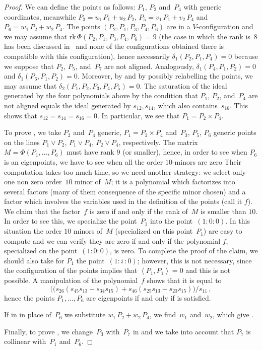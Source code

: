 \documentclass[a4paper, 11pt, reqno]{amsart}
\theoremstyle{plain}
\theoremstyle{definition}
\newcommand{\iii}{\textit{i}\,}
\newcommand{\rk}{\ensuremath{\mathrm{rk}}}
\newcommand{\scl}[2]{\left\langle {#1}, {#2} \right\rangle}
\begin{document}
\begin{proof}
We can define the points as follows: $P_1$, $P_2$ and~$P_4$ with generic
coordinates, meanwhile $P_3 = u_1 \, P_1 + u_2 \, P_2$, $P_5 = v_1 \, P_1 + v_2 \, P_4$ and
$P_6 = w_1 \, P_2 + w_2 \, P_4$. The points $(P_2, P_1, P_3, P_4, P_6)$ are in a
$V$-configuration and we may assume that $\rk \, \Phi(P_2, P_1, P_3, P_4, P_6) = 9$ (the case in which the rank is~$8$ has been discussed in~ and none of the 
configurations obtained there is compatible with this configuration), hence necessarily $\delta_1(P_2, P_1, P_4)=0$ because we suppose that $P_2$, $P_5$, and~$P_7$ are not aligned.
Analogously, $\delta_1(P_4, P_1, P_2) = 0$ and $\delta_1(P_6, P_1, P_2) = 0$. Moreover, by  and by possibly relabelling the points, we may assume that $\delta_2(P_1, P_2, P_3, P_4, P_5)=0$. The saturation of the ideal generated by the four polynomials
above by the condition that $P_1$, $P_2$, and~$P_4$ are not aligned equals the ideal generated by
$s_{12}, s_{14}$, which also contains~$s_{16}$. This shows that
$s_{12} = s_{14}=s_{16}=0$. In particular, we see that $P_1 = P_2 \times P_4$.

To prove , we take $P_2$ and~$P_4$ generic,
$P_1 = P_2 \times P_4$ and~$P_3$, $P_5$, $P_6$ generic points on the lines
$P_1 \vee P_2$, $P_1 \vee P_4$, $P_2 \vee P_4$, respectively. 
The matrix $M = \Phi(P_1, \dots, P_6)$ must have rank $9$ (or smaller), 
hence, in order to see when $P_6$ is an eigenpoints,
we have to see when all the order $10$-minors are zero
Their computation takes too much time, so we need another strategy:
we select only one non zero order~$10$ minor of~$M$; 
it is a polynomial which factorizes into several factors 
(many of them consequence of the specific minor chosen) 
and a factor which involves the variables used in the definition
of the points (call it $f$). 
We claim that the factor~$f$ is zero if and only if the rank of~$M$ is smaller than $10$.
In order to see this, we specialize the point~$P_1$
into the point~$(1:0:0)$. In this situation the order $10$ minors of~$M$
(specialized on this point~$P_1$) are easy to compute and we can
verify they are zero if and only if the polynomial $f$, specialized
on the point~$(1:0:0)$, is zero. 
To complete the proof of the claim, 
we should also take for $P_1$ the point~$(1:\iii:0)$;
however, this is not necessary, since the configuration of the points implies that $\scl{P_1}{P_1}=0$ and
this is not possible. 
A manipulation of the polynomial~$f$ shows that it is equal to
%
\[
  \bigl((s_{26}(s_{45}s_{13}-s_{34}s_{15})+s_{46}(s_{25}s_{13}-s_{23}s_{15})\bigr)/s_{11} \,,
\]
%
hence the points $P_1, \dots, P_6$ are eigenpoints if and only if  is satisfied.

If in  in place of~$P_6$ we substitute $w_1 \, P_2 + w_2 \, P_4$,
we find~$w_1$ and~$w_2$, which give .

Finally, to prove , we change~$P_3$ with~$P_7$ in  and we take into account that $P_7$ is collinear with~$P_1$ and~$P_6$.
\end{proof}
\end{document}
